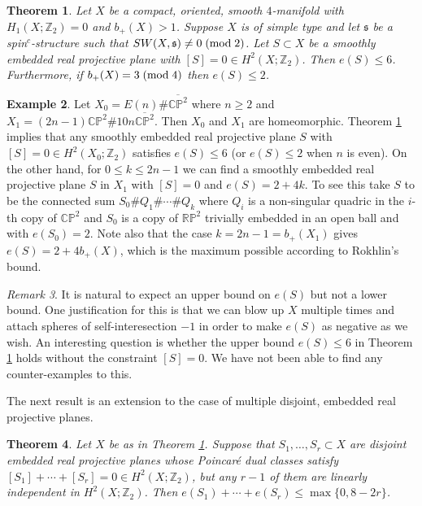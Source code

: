 \documentclass{amsart}
\newtheorem{theorem}{Theorem}[section]
\theoremstyle{definition}
\newtheorem{example}[theorem]{Example}
\theoremstyle{remark}
\newtheorem{remark}[theorem]{Remark}
\numberwithin{equation}{section}
\begin{document}
\begin{theorem}\label{thm:1rp2}
Let $X$ be a compact, oriented, smooth $4$-manifold with $H_1(X ; \mathbb{Z}_2) = 0$ and $b_+(X) > 1$. Suppose $X$ is of simple type and let $\mathfrak{s}$ be a spin$^c$-structure such that $SW(X , \mathfrak{s}) \neq 0 \; ({\rm mod} \; 2)$. Let $S \subset X$ be a smoothly embedded real projective plane with $[S] = 0 \in H^2(X ; \mathbb{Z}_2)$. Then $e(S) \le 6$. Furthermore, if $b_+(X) = 3 \; ({\rm mod} \; 4)$ then $e(S) \le 2$.
\end{theorem}

\begin{example}
Let $X_0 = E(n) \# \overline{\mathbb{CP}^2}$ where $n \ge 2$ and $X_1 = (2n-1)\mathbb{CP}^2 \# 10n \overline{\mathbb{CP}^2}$. Then $X_0$ and $X_1$ are homeomorphic. Theorem \ref{thm:1rp2} implies that any smoothly embedded real projective plane $S$ with $[S] = 0 \in H^2(X_0 ; \mathbb{Z}_2)$ satisfies $e(S) \le 6$ (or $e(S) \le 2$ when $n$ is even). On the other hand, for $0 \le k \le 2n-1$ we can find a smoothly embedded real projective plane $S$ in $X_1$ with $[S] = 0$ and $e(S) = 2+4k$. To see this take $S$ to be the connected sum $S_0 \# Q_1 \# \cdots \# Q_k$ where $Q_i$ is a non-singular quadric in the $i$-th copy of $\mathbb{CP}^2$ and $S_0$ is a copy of $\mathbb{RP}^2$ trivially embedded in an open ball and with $e(S_0) = 2$. Note also that the case $k = 2n-1 = b_+(X_1)$ gives $e(S) = 2 + 4 b_+(X)$, which is the maximum possible according to Rokhlin's bound.
\end{example}



\begin{remark}
It is natural to expect an upper bound on $e(S)$ but not a lower bound. One justification for this is that we can blow up $X$ multiple times and attach spheres of self-interesection $-1$ in order to make $e(S)$ as negative as we wish. An interesting question is whether the upper bound $e(S) \le 6$ in Theorem \ref{thm:1rp2} holds without the constraint $[S] = 0$. We have not been able to find any counter-examples to this.
\end{remark}

The next result is an extension to the case of multiple disjoint, embedded real projective planes.

\begin{theorem}
Let $X$ be as in Theorem \ref{thm:1rp2}. Suppose that $S_1, \dots , S_r \subset X$ are disjoint embedded real projective planes whose Poincar\'e dual classes satisfy $[S_1] + \cdots + [S_r] = 0 \in H^2(X ; \mathbb{Z}_2)$, but any $r-1$ of them are linearly independent in $H^2(X ; \mathbb{Z}_2)$. Then $e(S_1) + \cdots + e(S_r) \le \max\{ 0 , 8-2r\}$.
\end{theorem}
\end{document}
